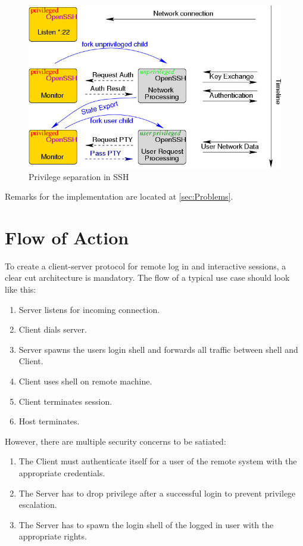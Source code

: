\documentclass[10pt,a4paper,titlepage,twoside,english,final]{zhawreprt}
\begin{document}
\begin{figure}[ht]
\includegraphics[width=\textwidth]{priv}
\caption{Privilege separation in SSH \citep{ProvosSSHPriv}}
\label{fig:PrivilegeSeparationInSSH}
\end{figure}

Remarks for the implementation are located at \ref{sec:Problems}.


\section{Flow of Action}\label{sec:DesignFlowOfAction}
To create a client-server protocol for remote log in and interactive sessions, a clear cut architecture is mandatory.
The flow of a typical use case should look like this:

\begin{enumerate}
\item Server listens for incoming connection.
\item Client dials server.
\item Server spawns the users \gls{login} \gls{shell} and forwards all traffic between \gls{shell} and Client.
\item Client uses \gls{shell} on remote machine.
\item Client terminates session.
\item Host terminates.
\end{enumerate}

However, there are multiple security concerns to be satiated:

\begin{enumerate}
\item The Client must authenticate itself for a user of the remote system with the appropriate credentials.
\item The Server has to drop privilege after a successful \gls{login} to prevent privilege escalation.
\item The Server has to spawn the \gls{login} \gls{shell} of the logged in user with the appropriate rights.
\end{enumerate}
\end{document}
